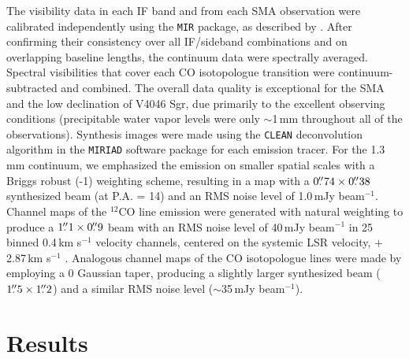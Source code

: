 {The visibility data in each IF band and from each SMA observation were
calibrated independently using the {\tt MIR} package, as described by
\citet{rosenfeld12}.  After confirming their consistency over all IF/sideband
combinations and on overlapping baseline lengths, the continuum data were
spectrally averaged.  Spectral visibilities that cover each CO isotopologue
transition were continuum-subtracted and combined.  The overall data quality is
exceptional for the SMA and the low declination of V4046 Sgr, due primarily to 
the excellent observing conditions (precipitable water vapor levels were only 
$\sim$1\,mm throughout all of the observations).  Synthesis images were made 
using the {\tt CLEAN} deconvolution algorithm in the {\tt MIRIAD} software 
package for each emission tracer.  For the 1.3\,mm continuum, we emphasized the 
emission on smaller spatial scales with a Briggs robust (-1) weighting scheme, resulting in a map with a
$0\mbox{$.\!\!^{\prime\prime}$}74\times0\mbox{$.\!\!^{\prime\prime}$}38$ synthesized beam (at P.A. = 14\degr) and an RMS
noise level of 1.0\,mJy beam$^{-1}$.  Channel maps of the $^{12}$CO line 
emission were generated with natural weighting to produce a 
$1\mbox{$.\!\!^{\prime\prime}$}1\times0\mbox{$.\!\!^{\prime\prime}$}9$ beam with an RMS noise level of 40\,mJy beam$^{-1}$ in
25 binned 0.4\,km s$^{-1}$ velocity channels, centered on the systemic LSR
velocity, $+$2.87\,km s$^{-1}$ \citep{rodriguez10}.  Analogous channel maps of 
the CO isotopologue lines were made by employing a 0 Gaussian taper, 
producing a slightly larger synthesized beam ($1\mbox{$.\!\!^{\prime\prime}$}5\times1\mbox{$.\!\!^{\prime\prime}$}2$) and a 
similar RMS noise level ($\sim$35\,mJy beam$^{-1}$).


\section{Results} \label{sec:results}

}
